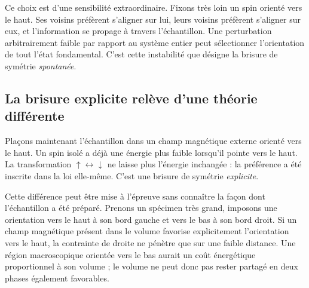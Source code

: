 Ce choix est d’une sensibilité extraordinaire. Fixons très loin un spin orienté vers le haut. Ses voisins préfèrent s’aligner sur lui, leurs voisins préfèrent s’aligner sur eux, et l’information se propage à travers l’échantillon. Une perturbation arbitrairement faible par rapport au système entier peut sélectionner l’orientation de tout l’état fondamental. C’est cette instabilité que désigne la brisure de symétrie \emph{spontanée}.

\begin{classroomqa}
\end{classroomqa}

\begin{classroomqa}
\end{classroomqa}

\subsection{La brisure explicite relève d’une théorie différente}

Plaçons maintenant l’échantillon dans un champ magnétique externe orienté vers le haut. Un spin isolé a déjà une énergie plus faible lorsqu’il pointe vers le haut. La transformation
\(\uparrow\leftrightarrow\downarrow\) ne laisse plus l’énergie inchangée : la préférence a été inscrite dans la loi elle-même. C’est une brisure de symétrie \emph{explicite}.

Cette différence peut être mise à l’épreuve sans connaître la façon dont l’échantillon a été préparé. Prenons un spécimen très grand, imposons une orientation vers le haut à son bord gauche et vers le bas à son bord droit. Si un champ magnétique présent dans le volume favorise explicitement l’orientation vers le haut, la contrainte de droite ne pénètre que sur une faible distance. Une région macroscopique orientée vers le bas aurait un coût énergétique proportionnel à son volume ; le volume ne peut donc pas rester partagé en deux phases également favorables.

